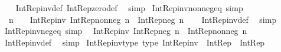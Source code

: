 \begin{isabellebody}
%
\isadelimproof
\ \ %
\endisadelimproof
%
\isatagproof
{}\isamarkupfalse%
\ Int{\isacharunderscore}{\kern0pt}Rep{\isacharunderscore}{\kern0pt}inv{\isacharunderscore}{\kern0pt}def\ Int{\isacharunderscore}{\kern0pt}Rep{\isacharunderscore}{\kern0pt}zero{\isacharunderscore}{\kern0pt}def\ \isamarkupfalse%
\ simp%
\endisatagproof
{\isafoldproof}%
%
\isadelimproof
\isanewline
%
\endisadelimproof
\isanewline
{}\isamarkupfalse%
\ Int{\isacharunderscore}{\kern0pt}Rep{\isacharunderscore}{\kern0pt}inv{\isacharunderscore}{\kern0pt}nonneg{\isacharunderscore}{\kern0pt}eq\ {\isacharbrackleft}{\kern0pt}simp{\isacharbrackright}{\kern0pt}{\isacharcolon}{\kern0pt}\isanewline
\ \ {\isachardoublequoteopen}n\ {\isasymnoteq}\ {}\ {\isasymLongrightarrow}\ Int{\isacharunderscore}{\kern0pt}Rep{\isacharunderscore}{\kern0pt}inv\ {\isacharparenleft}{\kern0pt}Int{\isacharunderscore}{\kern0pt}Rep{\isacharunderscore}{\kern0pt}nonneg\ n{\isacharparenright}{\kern0pt}\ {\isacharequal}{\kern0pt}\ Int{\isacharunderscore}{\kern0pt}Rep{\isacharunderscore}{\kern0pt}neg\ n{\isachardoublequoteclose}\isanewline
%
\isadelimproof
\ \ %
\endisadelimproof
%
\isatagproof
{}\isamarkupfalse%
\ Int{\isacharunderscore}{\kern0pt}Rep{\isacharunderscore}{\kern0pt}inv{\isacharunderscore}{\kern0pt}def\ \isamarkupfalse%
\ simp%
\endisatagproof
{\isafoldproof}%
%
\isadelimproof
\isanewline
%
\endisadelimproof
\isanewline
{}\isamarkupfalse%
\ Int{\isacharunderscore}{\kern0pt}Rep{\isacharunderscore}{\kern0pt}inv{\isacharunderscore}{\kern0pt}neg{\isacharunderscore}{\kern0pt}eq\ {\isacharbrackleft}{\kern0pt}simp{\isacharbrackright}{\kern0pt}{\isacharcolon}{\kern0pt}\isanewline
\ \ {\isachardoublequoteopen}Int{\isacharunderscore}{\kern0pt}Rep{\isacharunderscore}{\kern0pt}inv\ {\isacharparenleft}{\kern0pt}Int{\isacharunderscore}{\kern0pt}Rep{\isacharunderscore}{\kern0pt}neg\ n{\isacharparenright}{\kern0pt}\ {\isacharequal}{\kern0pt}\ Int{\isacharunderscore}{\kern0pt}Rep{\isacharunderscore}{\kern0pt}nonneg\ n{\isachardoublequoteclose}\isanewline
%
\isadelimproof
\ \ %
\endisadelimproof
%
\isatagproof
{}\isamarkupfalse%
\ Int{\isacharunderscore}{\kern0pt}Rep{\isacharunderscore}{\kern0pt}inv{\isacharunderscore}{\kern0pt}def\ \isamarkupfalse%
\ simp%
\endisatagproof
{\isafoldproof}%
%
\isadelimproof
\isanewline
%
\endisadelimproof
\isanewline
{}\isamarkupfalse%
\ Int{\isacharunderscore}{\kern0pt}Rep{\isacharunderscore}{\kern0pt}inv{\isacharunderscore}{\kern0pt}type\ {\isacharbrackleft}{\kern0pt}type{\isacharbrackright}{\kern0pt}{\isacharcolon}{\kern0pt}\ {\isachardoublequoteopen}Int{\isacharunderscore}{\kern0pt}Rep{\isacharunderscore}{\kern0pt}inv\ {\isacharcolon}{\kern0pt}\ Int{\isacharunderscore}{\kern0pt}Rep\ {\isasymRightarrow}\ Int{\isacharunderscore}{\kern0pt}Rep{\isachardoublequoteclose}\isanewline

\end{isabellebody}
